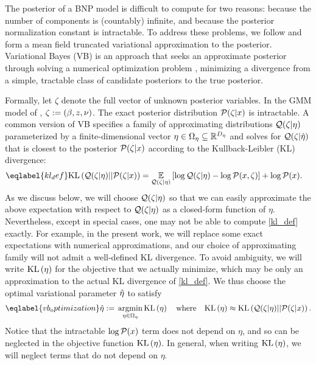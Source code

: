 The posterior of a BNP model is difficult to compute for two reasons: because
the number of components is (countably) infinite, and because the posterior
normalization constant is intractable.  To address these problems, we follow
\citet{blei:2006:vi_for_dp} and form a mean field truncated variational
approximation to the posterior. Variational Bayes (VB) is an approach that seeks
an approximate posterior through solving a numerical optimization problem
\citep{jordan:1999:vi, wainwright:2008:graphical_models, blei:2017:vi_review},
minimizing a divergence from a simple, tractable class of candidate posteriors
to the true posterior.

Formally, let $\zeta$ denote the full vector of unknown posterior variables. In
the GMM model of , $\zeta := (\beta, z, \nu)$.  The
exact posterior distribution $\mathcal{P}(\zeta \vert x)$ is intractable. A common
version of VB specifies a family of approximating distributions $\mathcal{Q}(\zeta \vert
\eta)$ parameterized by a finite-dimensional vector $\eta \in \Omega_{\eta} \subseteq
\mathbb{R}^{{D_{\eta}}}$ and solves for $\mathcal{Q}(\zeta\vert\hat\eta)$ that is closest to
the posterior $\mathcal{P}(\zeta \vert x)$ according to  the Kullback-Leibler (KL)
divergence:
%
\begin{align}\eqlabel{kl_def}
%
\KL{\q(\zeta \vert \eta) || \p(\zeta \vert \x)}
={}&    \expect{\q(\zeta \vert \eta)}{
        \log \q(\zeta \vert \eta) - \log\p(\x, \zeta)} + \log\p(\x).
%
\end{align}
%
As we discuss below, we will choose $\mathcal{Q}(\zeta \vert \eta)$ so that we can easily
approximate the above expectation with respect to $\mathcal{Q}(\zeta \vert \eta)$ as a
closed-form function of $\eta$.  Nevertheless, except in special cases, one may
not be able to compute \eqref{kl_def} exactly.  For example, in the present
work, we will replace some exact expectations with numerical approximations, and
our choice of approximating family will not admit a well-defined KL divergence.
To avoid ambiguity, we will write $\mathrm{KL}\left(\eta\right)$ for the objective that we actually
minimize, which may be only an approximation to the actual KL divergence of
\eqref{kl_def}.  We thus choose the optimal variational parameter $\hat\eta$ to
satisfy
%
\begin{align}\eqlabel{vb_optimization}
%
\etaopt :={} \argmin_{\eta \in \etadom} \KL{\eta} \mathwhere
\KL{\eta} \approx{} \KL{\q(\zeta \vert \eta) || \p(\zeta \vert \x)}.
%
\end{align}
%
Notice that the intractable $\log\mathcal{P}(x)$ term does not depend on $\eta$, and so
can be neglected in the objective function $\mathrm{KL}\left(\eta\right)$.  In general, when
writing $\mathrm{KL}\left(\eta\right)$, we will neglect terms that do not depend on $\eta$.


